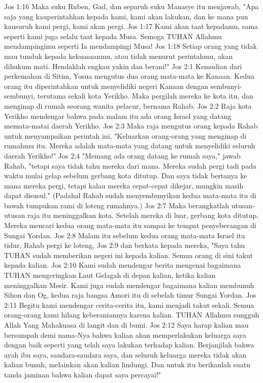 Jos 1:16  Maka suku Ruben, Gad, dan separuh suku Manasye itu menjawab, "Apa saja yang kauperintahkan kepada kami, kami akan lakukan, dan ke mana pun kausuruh kami pergi, kami akan pergi.
Jos 1:17  Kami akan taat kepadamu, sama seperti kami juga selalu taat kepada Musa. Semoga TUHAN Allahmu mendampingimu seperti Ia mendampingi Musa!
Jos 1:18  Setiap orang yang tidak mau tunduk kepada kekuasaanmu, atau tidak menurut perintahmu, akan dihukum mati. Hendaklah engkau yakin dan berani!"
Jos 2:1  Kemudian dari perkemahan di Sitim, Yosua mengutus dua orang mata-mata ke Kanaan. Kedua orang itu diperintahkan untuk menyelidiki negeri Kanaan dengan sembunyi-sembunyi, terutama sekali kota Yerikho. Maka pergilah mereka ke kota itu, dan menginap di rumah seorang wanita pelacur, bernama Rahab.
Jos 2:2  Raja kota Yerikho mendengar bahwa pada malam itu ada orang Israel yang datang memata-matai daerah Yerikho.
Jos 2:3  Maka raja mengutus orang kepada Rahab untuk menyampaikan perintah ini, "Keluarkan orang-orang yang menginap di rumahmu itu. Mereka adalah mata-mata yang datang untuk menyelidiki seluruh daerah Yerikho!"
Jos 2:4  "Memang ada orang datang ke rumah saya," jawab Rahab, "tetapi saya tidak tahu mereka dari mana. Mereka sudah pergi tadi pada waktu mulai gelap sebelum gerbang kota ditutup. Dan saya tidak bertanya ke mana mereka pergi, tetapi kalau mereka cepat-cepat dikejar, mungkin masih dapat disusul." (Padahal Rahab sudah menyembunyikan kedua mata-mata itu di bawah tumpukan rami di loteng rumahnya.)
Jos 2:7  Maka berangkatlah utusan-utusan raja itu meninggalkan kota. Setelah mereka di luar, gerbang kota ditutup. Mereka mencari kedua orang mata-mata itu sampai ke tempat penyeberangan di Sungai Yordan.
Jos 2:8  Malam itu sebelum kedua orang mata-mata Israel itu tidur, Rahab pergi ke loteng,
Jos 2:9  dan berkata kepada mereka, "Saya tahu TUHAN sudah memberikan negeri ini kepada kalian. Semua orang di sini takut kepada kalian.
Jos 2:10  Kami sudah mendengar berita mengenai bagaimana TUHAN mengeringkan Laut Gelagah di depan kalian, ketika kalian meninggalkan Mesir. Kami juga sudah mendengar bagaimana kalian membunuh Sihon dan Og, kedua raja bangsa Amori itu di sebelah timur Sungai Yordan.
Jos 2:11  Begitu kami mendengar cerita-cerita itu, kami menjadi takut sekali. Semua orang-orang kami hilang keberaniannya karena kalian. TUHAN Allahmu sungguh Allah Yang Mahakuasa di langit dan di bumi.
Jos 2:12  Saya harap kalian mau bersumpah demi nama-Nya bahwa kalian akan memperlakukan keluarga saya dengan baik seperti yang telah saya lakukan terhadap kalian. Berjanjilah bahwa ayah ibu saya, saudara-saudara saya, dan seluruh keluarga mereka tidak akan kalian bunuh, melainkan akan kalian lindungi. Dan untuk itu berikanlah suatu tanda jaminan bahwa kalian dapat saya percayai!"

